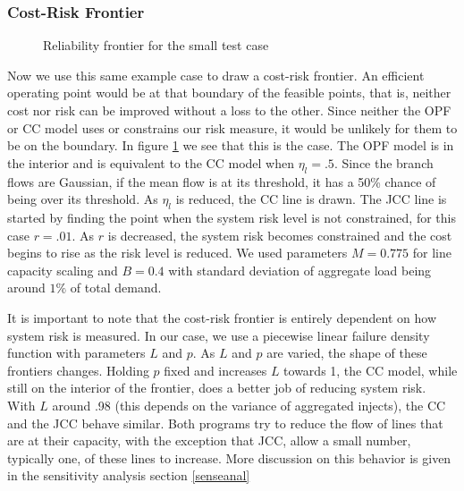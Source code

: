 \subsubsection*{Cost-Risk Frontier}
  \begin{figure} %
\centering

\caption{Reliability frontier for the small test case}\label{costriskfront}
\end{figure}
Now we use this same example case to draw a cost-risk frontier.  An efficient operating point would be at that boundary of the feasible points, that is, neither cost nor risk can be improved without a loss to the other.  Since neither the OPF or CC model uses or constrains our risk measure, it would be unlikely for them to be on the boundary.  In figure \ref{costriskfront} we see that this is the case.  The OPF model is in the interior and is equivalent to the CC model when $\eta_l=.5$.  Since the branch flows are Gaussian, if the mean flow is at its threshold, it has a 50\% chance of being over its threshold.  As $\eta_l$ is reduced, the CC line is drawn.  The JCC line is started by finding the point when the system risk level is not constrained, for this case $r=.01$.  As $r$ is decreased, the system risk becomes constrained and the cost begins to rise as the risk level is reduced.  We used parameters $M=0.775$ for line capacity scaling and $B=0.4$ with standard deviation of aggregate load being around $1\%$ of total demand.


It is important to note that the cost-risk frontier is entirely dependent on how system risk is measured.  In our case, we use a piecewise linear failure density function with parameters $L$ and $p$.  As $L$ and $p$ are varied, the shape of these frontiers changes.  Holding $p$ fixed and increases $L$ towards 1, the CC model, while still on the interior of the frontier, does a better job of reducing system risk.  With $L$ around .98 (this depends on the variance of aggregated injects), the CC and the JCC behave similar.  Both programs try to reduce the flow of lines that are at their capacity, with the exception that JCC, allow a small number, typically one, of these lines to increase.  More discussion on this behavior is given in the sensitivity analysis section \ref{senseanal}


